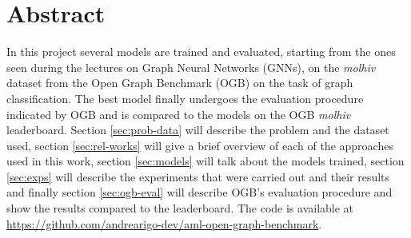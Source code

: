 \documentclass[journal]{IEEEtran}
\begin{document}







\maketitle









%
\IEEEpeerreviewmaketitle








\section*{Abstract}
In this project several models are trained and evaluated, starting from the ones seen during the lectures on Graph Neural Networks (GNNs), on the \textit{molhiv} dataset from the Open Graph Benchmark (OGB) \cite{ogbsite, hu2020ogb} on the task of graph classification.
The best model finally undergoes the evaluation procedure indicated by OGB and is compared to the models on the OGB \textit{molhiv} leaderboard.
Section \ref{sec:prob-data} will describe the problem and the dataset used, section \ref{sec:rel-works} will give a brief overview of each of the approaches used in this work, section \ref{sec:models} will talk about the models trained, section \ref{sec:exps} will describe the experiments that were carried out and their results and finally section \ref{sec:ogb-eval} will describe OGB's evaluation procedure and show the results compared to the leaderboard.
The code is available at \url{https://github.com/andrearigo-dev/aml-open-graph-benchmark}.
\end{document}
